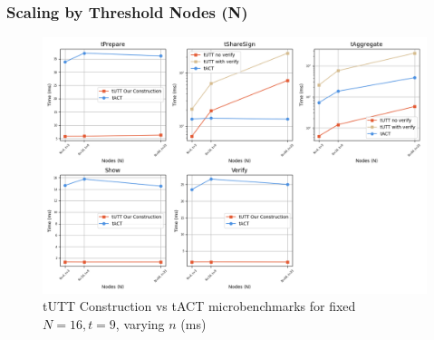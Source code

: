 \subsubsection{Scaling by Threshold Nodes (N)}
\begin{figure}[ht]
    \centering
    \includegraphics[width=1\linewidth]{figures/chap5_tutt_scale_by_N_nodes.png}
    \caption[tUTT our selected construction improves on 4/5 key metrics scaling credential attribute count (n)]{tUTT Construction vs tACT microbenchmarks for fixed $ N = 16, t = 9 $, varying $n$ (ms)}
    \label{fig:chap4_tutt_tact_microbenchmarks}
\end{figure}




